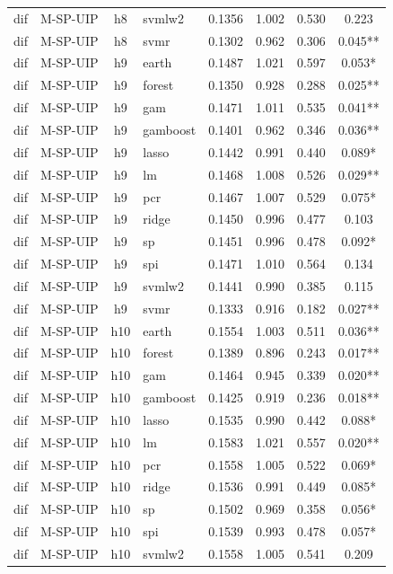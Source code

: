 \begin{ThreePartTable}
\begin{longtable}[t]{llclcccc}
dif & M-SP-UIP & h8 & svmlw2 & 0.1356 & 1.002 & 0.530 & 0.223\\
dif & M-SP-UIP & h8 & svmr & 0.1302 & 0.962 & 0.306 & 0.045**\\
\addlinespace
dif & M-SP-UIP & h9 & earth & 0.1487 & 1.021 & 0.597 & 0.053*\\
dif & M-SP-UIP & h9 & forest & 0.1350 & 0.928 & 0.288 & 0.025**\\
dif & M-SP-UIP & h9 & gam & 0.1471 & 1.011 & 0.535 & 0.041**\\
dif & M-SP-UIP & h9 & gamboost & 0.1401 & 0.962 & 0.346 & 0.036**\\
dif & M-SP-UIP & h9 & lasso & 0.1442 & 0.991 & 0.440 & 0.089*\\
dif & M-SP-UIP & h9 & lm & 0.1468 & 1.008 & 0.526 & 0.029**\\
dif & M-SP-UIP & h9 & pcr & 0.1467 & 1.007 & 0.529 & 0.075*\\
dif & M-SP-UIP & h9 & ridge & 0.1450 & 0.996 & 0.477 & 0.103\\
dif & M-SP-UIP & h9 & sp & 0.1451 & 0.996 & 0.478 & 0.092*\\
dif & M-SP-UIP & h9 & spi & 0.1471 & 1.010 & 0.564 & 0.134\\
dif & M-SP-UIP & h9 & svmlw2 & 0.1441 & 0.990 & 0.385 & 0.115\\
dif & M-SP-UIP & h9 & svmr & 0.1333 & 0.916 & 0.182 & 0.027**\\
\addlinespace
dif & M-SP-UIP & h10 & earth & 0.1554 & 1.003 & 0.511 & 0.036**\\
dif & M-SP-UIP & h10 & forest & 0.1389 & 0.896 & 0.243 & 0.017**\\
dif & M-SP-UIP & h10 & gam & 0.1464 & 0.945 & 0.339 & 0.020**\\
dif & M-SP-UIP & h10 & gamboost & 0.1425 & 0.919 & 0.236 & 0.018**\\
dif & M-SP-UIP & h10 & lasso & 0.1535 & 0.990 & 0.442 & 0.088*\\
dif & M-SP-UIP & h10 & lm & 0.1583 & 1.021 & 0.557 & 0.020**\\
dif & M-SP-UIP & h10 & pcr & 0.1558 & 1.005 & 0.522 & 0.069*\\
dif & M-SP-UIP & h10 & ridge & 0.1536 & 0.991 & 0.449 & 0.085*\\
dif & M-SP-UIP & h10 & sp & 0.1502 & 0.969 & 0.358 & 0.056*\\
dif & M-SP-UIP & h10 & spi & 0.1539 & 0.993 & 0.478 & 0.057*\\
dif & M-SP-UIP & h10 & svmlw2 & 0.1558 & 1.005 & 0.541 & 0.209\\

\end{longtable}
\end{ThreePartTable}
